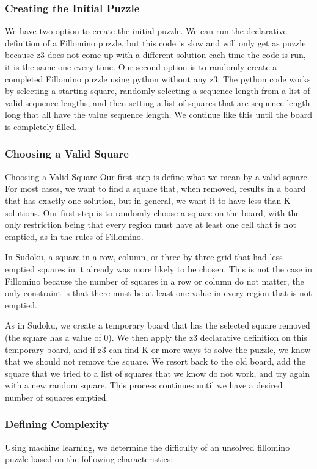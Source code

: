 \subsubsection{Creating the Initial Puzzle}
We have two option to create the initial puzzle. We can run the
declarative definition of a Fillomino puzzle, but this code is slow
and will only get as puzzle because z3 does not come up with a
different solution each time the code is run, it is the same one every
time. Our second option is to randomly create a completed Fillomino
puzzle using python without any z3. The python code works by selecting
a starting square, randomly selecting a sequence length from a list of
valid sequence lengths, and then setting a list of squares that are
sequence length long that all have the value sequence length. We
continue like this until the board is completely filled.



\subsubsection{Choosing a Valid Square}
Choosing a Valid Square
Our first step is define what we mean by a valid square. For most
cases, we want to find a square that, when removed, results in a board
that has exactly one solution, but in general, we want it to have less
than K solutions. Our first step is to randomly choose a square on the
board, with the only restriction being that every region must have at
least one cell that is not emptied, as in the rules of Fillomino. 

In Sudoku, a square in a row, column, or three by three grid that had
less emptied squares in it already was more likely to be chosen. This
is not the case in Fillomino because the number of squares in a row or
column do not matter, the only constraint is that there must be at
least one value in every region that is not emptied.
 
As in Sudoku, we create a temporary board that has the selected square
removed (the square has a value of 0). We then apply the z3
declarative definition on this temporary board, and if z3 can find K
or more ways to solve the puzzle, we know that we should not remove
the square. We resort back to the old board, add the square that we
tried to a list of squares that we know do not work, and try again
with a new random square. This process continues until we have a
desired number of squares emptied.

\subsubsection{Defining Complexity}
Using machine learning, we determine the difficulty of an unsolved
fillomino puzzle based on the following characteristics:

